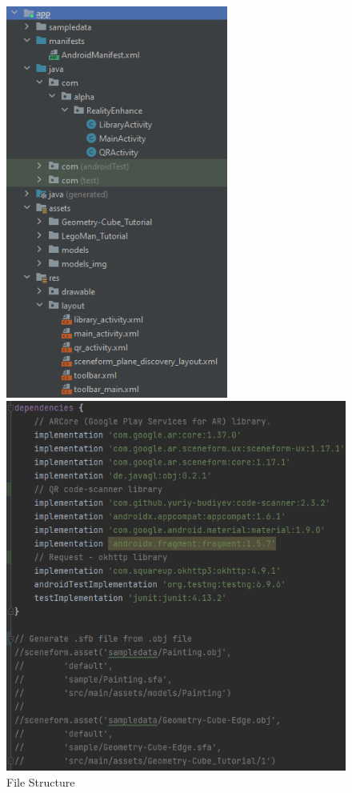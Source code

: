 \begin{figure}[ht]
\begin{minipage}{0.5\textwidth}
        \begin{center}
            \includegraphics[width=0.65\textwidth]{img/File Structure.png}
            \caption{File Structure}
            \label{fig:FileStructure}
        \end{center}
    \end{minipage}
    \begin{minipage}{0.5\textwidth}
        \begin{center}
            \includegraphics[width=1\textwidth]{img/Dependencies.png}

\end{center}
\end{minipage}
\end{figure}

